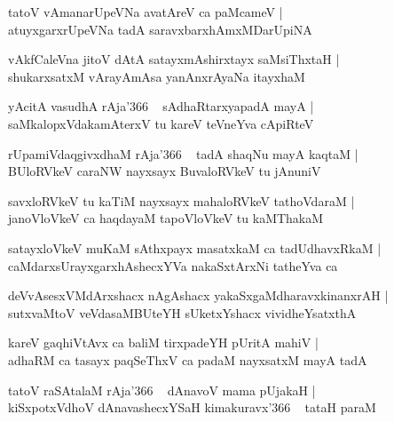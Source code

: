 \documentclass[twoside,12pt,openright]{book}
\newcounter{shloka}[chapter]
\begin{document}
\begin{shloka}%
tatoV vAmanarUpeVNa avatAreV ca paMcameV |\\
atuyxgarxrUpeVNa tadA saravxbarxhAmxMDarUpiNA
\end{shloka}

\begin{shloka}%
vAkfCaleVna jitoV dAtA satayxmAshirxtayx saMsiThxtaH |\\
shukarxsatxM vArayAmAsa yanAnxrAyaNa itayxhaM 
\end{shloka}

\begin{shloka}%
yAcitA vasudhA rAja\char'366 ~ sAdhaRtarxyapadA mayA |\\
saMkalopxVdakamAterxV tu kareV teVneYva cApiRteV
\end{shloka}

\begin{shloka}%
rUpamiVdaqgivxdhaM rAja\char'366 ~ tadA shaqNu mayA kaqtaM |\\
BUloRVkeV caraNW nayxsayx BuvaloRVkeV tu jAnuniV 
\end{shloka}

\begin{shloka}%
savxloRVkeV tu kaTiM nayxsayx mahaloRVkeV tathoVdaraM |\\
janoVloVkeV ca haqdayaM tapoVloVkeV tu kaMThakaM 
\end{shloka}

\begin{shloka}%
satayxloVkeV muKaM sAthxpayx masatxkaM ca tadUdhavxRkaM |\\
caMdarxsUrayxgarxhAshecxYVa nakaSxtArxNi tatheYva ca 
\end{shloka}

\begin{shloka}%
deVvAsesxVMdArxshacx nAgAshacx yakaSxgaMdharavxkinanxrAH |\\
sutxvaMtoV veVdasaMBUteYH sUketxYshacx vividheYsatxthA 
\end{shloka}

\begin{shloka}%
kareV gaqhiVtAvx ca baliM tirxpadeYH pUritA mahiV |\\
adhaRM ca tasayx paqSeThxV ca padaM nayxsatxM mayA tadA 
\end{shloka}

\begin{shloka}%
tatoV raSAtalaM rAja\char'366 ~ dAnavoV mama pUjakaH |\\
kiSxpotxVdhoV dAnavashecxYSaH kimakuravx\char'366 ~ tataH paraM
\end{shloka}
\end{document}
